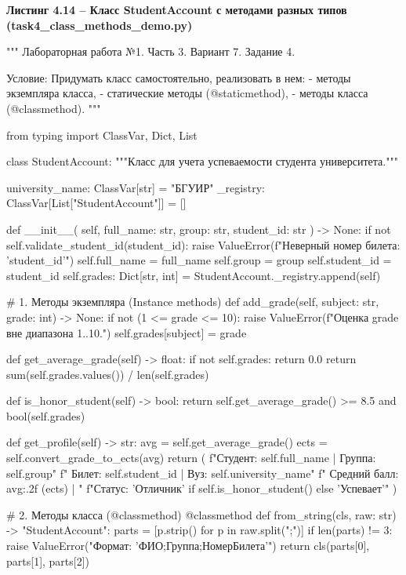 \documentclass[14pt,a4paper]{extarticle}
\newcommand{\listingtitle}[1]{%
  \par\vspace{8pt}%
  \noindent\hspace*{1.25cm}\textbf{#1}\par\vspace{2pt}%
}
\begin{document}
\listingtitle{Листинг 4.14 -- Класс StudentAccount с методами разных типов (task4\_class\_methods\_demo.py)}
\begin{CodeListing}
"""
Лабораторная работа №1. Часть 3.
Вариант 7. Задание 4.

Условие:
Придумать класс самостоятельно, реализовать в нем:
- методы экземпляра класса,
- статические методы (@staticmethod),
- методы класса (@classmethod).
"""

from typing import ClassVar, Dict, List


class StudentAccount:
    """Класс для учета успеваемости студента университета."""

    university_name: ClassVar[str] = "БГУИР"
    _registry: ClassVar[List["StudentAccount"]] = []

    def __init__(
        self, full_name: str, group: str, student_id: str
    ) -> None:
        if not self.validate_student_id(student_id):
            raise ValueError(f"Неверный номер билета: '{student_id}'")
        self.full_name = full_name
        self.group = group
        self.student_id = student_id
        self.grades: Dict[str, int] = {}
        StudentAccount._registry.append(self)

    # 1. Методы экземпляра (Instance methods)
    def add_grade(self, subject: str, grade: int) -> None:
        if not (1 <= grade <= 10):
            raise ValueError(f"Оценка {grade} вне диапазона 1..10.")
        self.grades[subject] = grade

    def get_average_grade(self) -> float:
        if not self.grades:
            return 0.0
        return sum(self.grades.values()) / len(self.grades)

    def is_honor_student(self) -> bool:
        return self.get_average_grade() >= 8.5 and bool(self.grades)

    def get_profile(self) -> str:
        avg = self.get_average_grade()
        ects = self.convert_grade_to_ects(avg)
        return (
            f"Студент: {self.full_name} | Группа: {self.group}\n"
            f"  Билет: {self.student_id} | Вуз: {self.university_name}\n"
            f"  Средний балл: {avg:.2f} ({ects}) | "
            f"Статус: {'Отличник' if self.is_honor_student() else 'Успевает'}"
        )

    # 2. Методы класса (@classmethod)
    @classmethod
    def from_string(cls, raw: str) -> "StudentAccount":
        parts = [p.strip() for p in raw.split(";")]
        if len(parts) != 3:
            raise ValueError("Формат: 'ФИО;Группа;НомерБилета'")
        return cls(parts[0], parts[1], parts[2])


\end{CodeListing}
\end{document}
